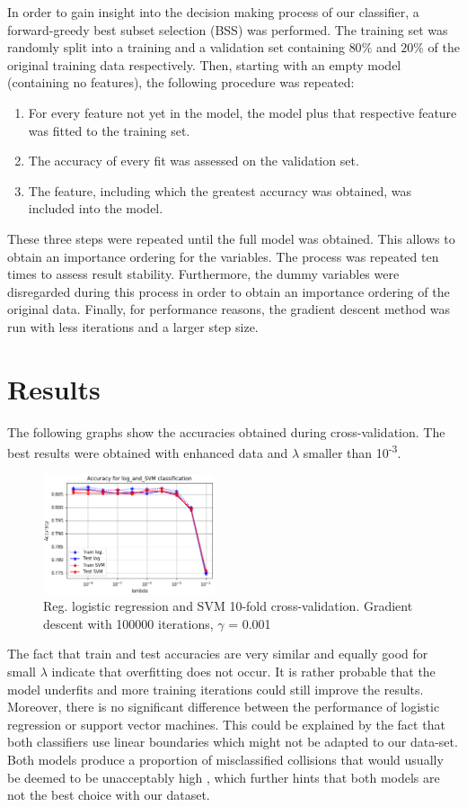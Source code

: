 \documentclass[10pt,conference,compsocconf]{IEEEtran}
\begin{document}
\par
In order to gain insight into the decision making process of our classifier, a forward-greedy best subset selection (BSS) was performed. The training set was randomly split into a training and a validation set containing $80\%$ and $20\%$ of the original training data respectively. Then, starting with an empty model (containing no features), the following procedure was repeated: 
\begin{enumerate}
	\item For every feature not yet in the model, the model plus that respective feature was fitted to the training set.
	\item The accuracy of every fit was assessed on the validation set.  
	\item The feature, including which the greatest accuracy was obtained, was included into the model.
\end{enumerate}
These three steps were repeated until the full model was obtained. This allows to obtain an importance ordering for the variables. The process was repeated ten times to assess result stability. Furthermore, the dummy variables were disregarded during this process in order to obtain an importance ordering of the original data. Finally, for performance reasons, the gradient descent method was run with less iterations and a larger step size.
\section*{Results}
The following graphs show the accuracies obtained during cross-validation. The best results were obtained with enhanced data and $\lambda$ smaller than 10\textsuperscript{-3}. 
\begin{figure}[H]
	\centering
	\includegraphics[width=0.45\textwidth]{accuracy_log_and_SVM.png}
	\caption{Reg. logistic regression and SVM 10-fold cross-validation. Gradient descent with 100000 iterations, $\gamma$ = 0.001}
\end{figure}


The fact that train and test accuracies are very similar and equally good for small $\lambda$ indicate that overfitting does not occur. It is rather probable that the model underfits and more training iterations could still improve the results. Moreover, there is no significant difference between the performance of logistic regression or support vector machines. This could be explained by the fact that both classifiers use linear boundaries which might not be adapted to our data-set. Both models produce a proportion of misclassified collisions that would usually be deemed to be unacceptably high \cite{advice}, which further hints that both models are not the best choice with our dataset.
\end{document}
